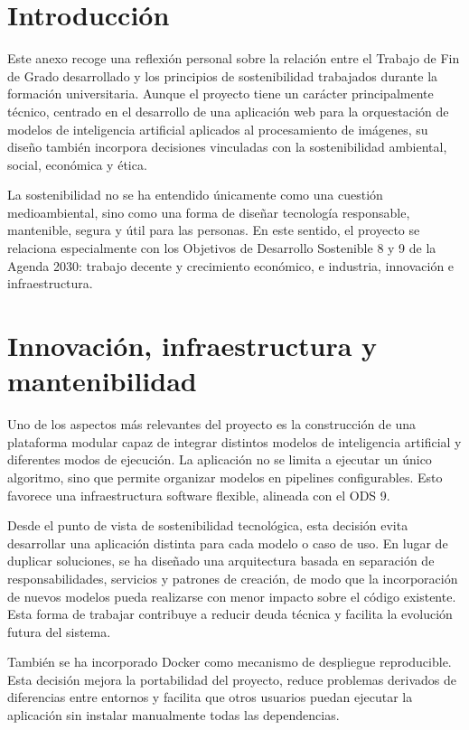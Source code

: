 
\section{Introducción}

Este anexo recoge una reflexión personal sobre la relación entre el Trabajo de Fin de Grado desarrollado y los principios de sostenibilidad trabajados durante la formación universitaria. Aunque el proyecto tiene un carácter principalmente técnico, centrado en el desarrollo de una aplicación web para la orquestación de modelos de inteligencia artificial aplicados al procesamiento de imágenes, su diseño también incorpora decisiones vinculadas con la sostenibilidad ambiental, social, económica y ética.

La sostenibilidad no se ha entendido únicamente como una cuestión medioambiental, sino como una forma de diseñar tecnología responsable, mantenible, segura y útil para las personas. En este sentido, el proyecto se relaciona especialmente con los Objetivos de Desarrollo Sostenible 8 y 9 de la Agenda 2030: trabajo decente y crecimiento económico, e industria, innovación e infraestructura.

\section{Innovación, infraestructura y mantenibilidad}

Uno de los aspectos más relevantes del proyecto es la construcción de una plataforma modular capaz de integrar distintos modelos de inteligencia artificial y diferentes modos de ejecución. La aplicación no se limita a ejecutar un único algoritmo, sino que permite organizar modelos en pipelines configurables. Esto favorece una infraestructura software flexible, alineada con el ODS 9.

Desde el punto de vista de sostenibilidad tecnológica, esta decisión evita desarrollar una aplicación distinta para cada modelo o caso de uso. En lugar de duplicar soluciones, se ha diseñado una arquitectura basada en separación de responsabilidades, servicios y patrones de creación, de modo que la incorporación de nuevos modelos pueda realizarse con menor impacto sobre el código existente. Esta forma de trabajar contribuye a reducir deuda técnica y facilita la evolución futura del sistema.

También se ha incorporado Docker como mecanismo de despliegue reproducible. Esta decisión mejora la portabilidad del proyecto, reduce problemas derivados de diferencias entre entornos y facilita que otros usuarios puedan ejecutar la aplicación sin instalar manualmente todas las dependencias.

